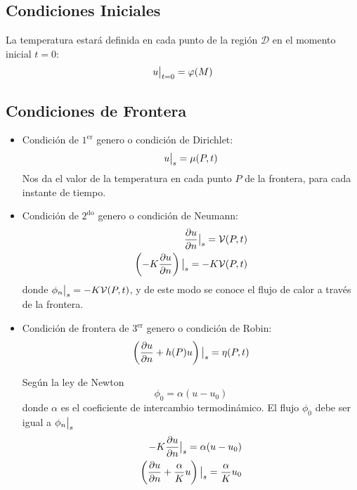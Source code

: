 \documentclass[../main]{subfiles}
\begin{document}
\begin{enumerate}
    \subsection*{Condiciones Iniciales}
    La temperatura estará definida en cada punto de la región $\mathcal{D}$ en el momento inicial $t=0$:
    \begin{equation}
        u \big{|}_{t=0}=\varphi(M)
    \end{equation}
    \subsection*{Condiciones de Frontera}
    \begin{itemize}
        \item Condición de $1^{\text{er}}$ genero o condición de Dirichlet:
        \begin{equation}
            u \big{|}_s=\mu(P,t)
        \end{equation}
        Nos da el valor de la temperatura en cada punto $P$ de la frontera, para cada instante de tiempo.
        \item Condición de $2^{\text{do}}$ genero o condición de Neumann:
        \begin{align}
            \pdv{u}{n}\big{|}_s=\mathcal{V}(P,t)  \\
            \left(-K\pdv{u}{n}\right) \big{|}_s=-K\mathcal{V}(P,t)
        \end{align}
        donde $\phi_n \big{|}_s=-K\mathcal{V}(P,t)$, y de este modo se conoce el flujo de calor a través de la frontera.
        \item Condición de frontera de $3^{\text{er}}$ genero o condición de Robin:
        \begin{equation}
            \left( \pdv{u}{n}+h(P)u\right)\big{|}_s={\eta}(P,t)
        \end{equation}
        \begin{minipage}{0.5\textwidth}
        Según la ley de Newton
        \begin{equation*}
            \phi_0=\alpha(u-u_0)
        \end{equation*}
        donde $\alpha$ es el coeficiente de intercambio termodinámico. El flujo $\phi_0$ debe ser igual a $\phi_n \big{|}_s$
        \begin{align*}
            -K\pdv{u}{n}\big{|}_s=\alpha(u-u_0) \\
            \left( \pdv{u}{n}+\dfrac{\alpha}{K}u\right)\big{|}_s=\dfrac{\alpha}{K}u_0
        \end{align*}
        \end{minipage}
        \begin{minipage}{0.5\textwidth}
            

\end{minipage}
\end{itemize}
\end{enumerate}
\end{document}
